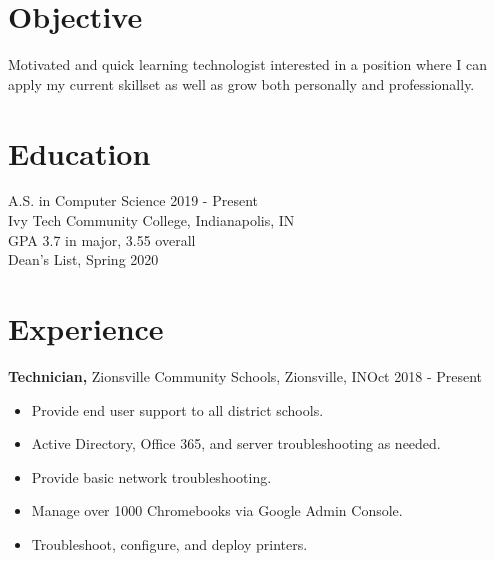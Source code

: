 \documentclass[margin]{res}
\begin{document}
 
 
 
\address{{\bf Address} \\ 417 W North St \\ Lebanon, IN 46052  \\
        }
\address{{\bf Contact Information} \\ sdixon@posteo.net \\ https://sjd.im \\
        (317) 450-8066}

 
\begin{resume} 
 
\section{Objective} 
Motivated and quick learning technologist interested in a position where I can apply my current skillset as well as grow both personally and professionally. 

\section{Education} 
A.S. in Computer Science \hfill2019 - Present\\
Ivy Tech Community College, Indianapolis, IN\\
GPA 3.7 in major, 3.55 overall\\
Dean's List, Spring 2020
 

\section{Experience}
 {\bf Technician,} Zionsville Community Schools, Zionsville, IN\hfill Oct 2018 - Present
 \begin{itemize} \itemsep -2pt  %
 \item Provide end user support to all district schools.
 \item Active Directory, Office 365, and server troubleshooting as needed.
 \item Provide basic network troubleshooting.
 \item Manage over 1000 Chromebooks via Google Admin Console.
 \item Troubleshoot, configure, and deploy printers.
 \end{itemize}


\end{resume}
\end{document}
